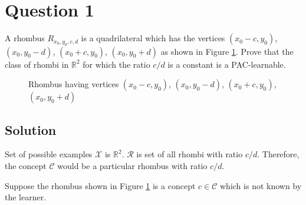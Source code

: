 
\section*{Question 1}

A rhombus $R_{x_0, y_0, c, d}$ is a quadrilateral which has the vertices $(x_0-c, y_0)$, $(x_0, y_0-d)$, $(x_0+c, y_0)$, $(x_0, y_0+d)$ as shown in Figure \ref{fig11}.
Prove that the class of rhombi  in $\mathbb{R}^2$ for which the ratio $c/d$ is a constant is a PAC-learnable.

\begin{figure}[H]
\centering
{}
\caption{Rhombus having vertices $(x_0-c, y_0)$, $(x_0, y_0-d)$, $(x_0+c, y_0)$, $(x_0, y_0+d)$}\label{fig11}
\end{figure}

\subsection*{Solution}

Set of possible examples $\mathcal{X}$ is $\mathbb{R}^2$.
$\mathcal{R}$ is set of all rhombi with ratio $c/d$.
Therefore, the concept $\mathcal{C}$ would be a particular rhombus with ratio $c/d$.

Suppose the rhombus shown in Figure \ref{fig11} is a concept $c \in \mathcal{C}$ which is not known by the learner.

